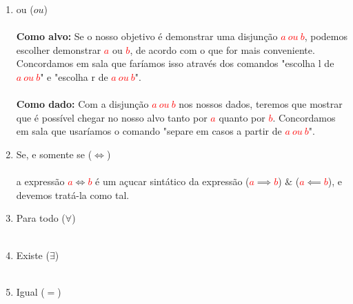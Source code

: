\documentclass[a4paper, 12pt]{article}
\begin{document}
\begin{enumerate}[($i$)]
    \item ou ($ou$) \\ \\
    \textbf{Como alvo:} Se o nosso objetivo é demonstrar uma disjunção \textcolor{red}{$a~ou~b$}, podemos escolher demonstrar \textcolor{red}{$a$} ou \textcolor{red}{$b$}, de acordo com o que for mais conveniente. Concordamos em sala que faríamos isso através dos comandos "escolha l de \textcolor{red}{$a~ou~b$}" e "escolha r de \textcolor{red}{$a~ou~b$}". \\ \\
    \textbf{Como dado:} Com a disjunção \textcolor{red}{$a~ou~b$} nos nossos dados, teremos que mostrar que é possível chegar no nosso alvo tanto por \textcolor{red}{$a$} quanto por \textcolor{red}{$b$}. Concordamos em sala que usaríamos o comando "separe em casos a partir de \textcolor{red}{$a~ou~b$}".
    \item Se, e somente se ($\iff$) \\ \\
    a expressão \textcolor{red}{$a$}$\iff$\textcolor{red}{$b$} é um açucar sintático da expressão (\textcolor{red}{$a$}$\implies$\textcolor{red}{$b$}) $\&$ (\textcolor{red}{$a$}$\impliedby$\textcolor{red}{$b$}), e devemos tratá-la como tal.
    \item Para todo ($\forall$) \\ \\
    \item Existe ($\exists$) \\ \\
    \item Igual ($=$) \\
\end{enumerate}
\end{document}
